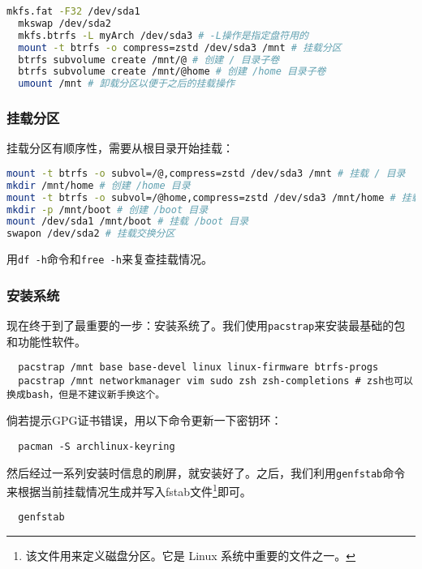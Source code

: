 \documentclass[../main.tex]{subfiles}
\begin{document}
\begin{lstlisting}[language=bash]
  mkfs.fat -F32 /dev/sda1
  mkswap /dev/sda2
  mkfs.btrfs -L myArch /dev/sda3 # -L操作是指定盘符用的
  mount -t btrfs -o compress=zstd /dev/sda3 /mnt # 挂载分区
  btrfs subvolume create /mnt/@ # 创建 / 目录子卷
  btrfs subvolume create /mnt/@home # 创建 /home 目录子卷
  umount /mnt # 卸载分区以便于之后的挂载操作
\end{lstlisting}

\subsubsection{挂载分区}

挂载分区有顺序性，需要从根目录开始挂载：

\begin{lstlisting}[language=bash]
mount -t btrfs -o subvol=/@,compress=zstd /dev/sda3 /mnt # 挂载 / 目录
mkdir /mnt/home # 创建 /home 目录
mount -t btrfs -o subvol=/@home,compress=zstd /dev/sda3 /mnt/home # 挂载 /home 目录
mkdir -p /mnt/boot # 创建 /boot 目录
mount /dev/sda1 /mnt/boot # 挂载 /boot 目录
swapon /dev/sda2 # 挂载交换分区
\end{lstlisting}

用\texttt{df -h}命令和\texttt{free -h}来复查挂载情况。

\subsubsection{安装系统}

现在终于到了最重要的一步：安装系统了。我们使用\texttt{pacstrap}来安装最基础的包和功能性软件。

\begin{lstlisting}
  pacstrap /mnt base base-devel linux linux-firmware btrfs-progs
  pacstrap /mnt networkmanager vim sudo zsh zsh-completions # zsh也可以换成bash，但是不建议新手换这个。
\end{lstlisting}

倘若提示GPG证书错误，用以下命令更新一下密钥环：

\begin{lstlisting}
  pacman -S archlinux-keyring
\end{lstlisting}

然后经过一系列安装时信息的刷屏，就安装好了。之后，我们利用\texttt{genfstab}命令来根据当前挂载情况生成并写入fstab文件\footnote{该文件用来定义磁盘分区。它是 Linux 系统中重要的文件之一。}即可。

\begin{lstlisting}
  genfstab
\end{lstlisting}
\end{document}
